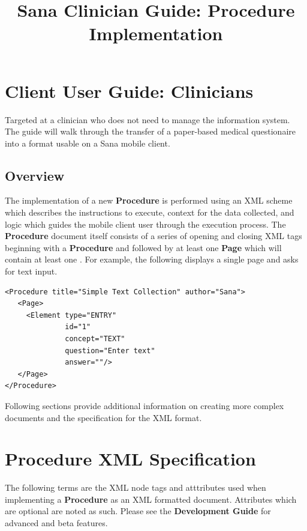 \documentclass[a4paper,10pt]{article}
\title{Sana Clinician Guide: Procedure Implementation}
\author{}
\begin{document}
\maketitle

\begin{abstract}

\end{abstract}

\section{Client User Guide: Clinicians}
Targeted at a clinician who does not need to manage the information system. The 
guide will walk through the transfer of a paper-based medical questionaire into 
a format usable on a Sana mobile client. 

\subsection{Overview}
The implementation of a new \textbf{Procedure} is performed using an XML scheme 
which describes the instructions to execute, context for the data collected, and
logic which guides the mobile client user through the execution process. The 
\textbf{Procedure} document itself consists of a series of opening and closing
XML tags beginning with a \textbf{Procedure} and followed by at least one
\textbf{Page} which will contain at least one . For example,
the following displays a single page and asks for text input.

\begin{verbatim}
<Procedure title="Simple Text Collection" author="Sana">
   <Page> 
     <Element type="ENTRY"
              id="1"
              concept="TEXT"
              question="Enter text" 
              answer=""/>
   </Page>
</Procedure>
\end{verbatim}

Following sections provide additional information on creating more complex
documents and the specification for the XML format.

\section{Procedure XML Specification} 
The following terms are the XML node tags and atttributes used when implementing
a \textbf{Procedure} as an XML formatted document. Attributes which are optional
are noted as such. Please see the \textbf{Development Guide} for advanced and 
beta features.
\end{document}
